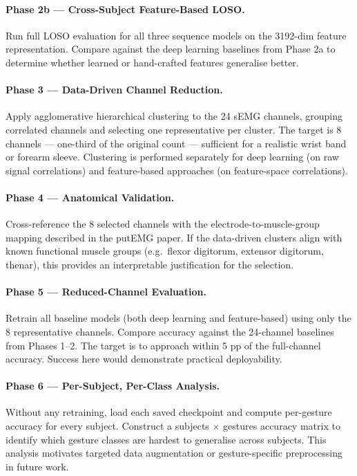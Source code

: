 \documentclass[11pt,twocolumn]{article}
\begin{document}
\paragraph{Phase 2b — Cross-Subject Feature-Based LOSO.}
Run full LOSO evaluation for all three sequence models on the 3192-dim feature
representation. Compare against the deep learning baselines from Phase 2a to
determine whether learned or hand-crafted features generalise better.

\paragraph{Phase 3 — Data-Driven Channel Reduction.}
Apply agglomerative hierarchical clustering to the 24 sEMG channels, grouping
correlated channels and selecting one representative per cluster. The target is
8 channels — one-third of the original count — sufficient for a realistic wrist
band or forearm sleeve. Clustering is performed separately for deep learning
(on raw signal correlations) and feature-based approaches (on feature-space
correlations).

\paragraph{Phase 4 — Anatomical Validation.}
Cross-reference the 8 selected channels with the electrode-to-muscle-group
mapping described in the putEMG paper. If the data-driven clusters align with
known functional muscle groups (e.g.\ flexor digitorum, extensor digitorum,
thenar), this provides an interpretable justification for the selection.

\paragraph{Phase 5 — Reduced-Channel Evaluation.}
Retrain all baseline models (both deep learning and feature-based) using only
the 8 representative channels. Compare accuracy against the 24-channel baselines
from Phases 1--2. The target is to approach within 5 pp of the full-channel
accuracy. Success here would demonstrate practical deployability.

\paragraph{Phase 6 — Per-Subject, Per-Class Analysis.}
Without any retraining, load each saved checkpoint and compute per-gesture
accuracy for every subject. Construct a subjects $\times$ gestures accuracy
matrix to identify which gesture classes are hardest to generalise across
subjects. This analysis motivates targeted data augmentation or gesture-specific
preprocessing in future work.
\end{document}
